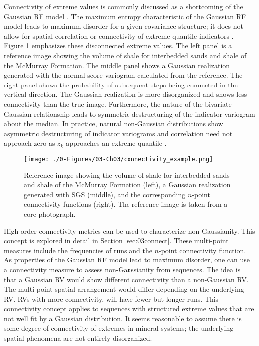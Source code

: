 Connectivity of extreme values is commonly discussed as a shortcoming of the Gaussian \gls{RF} model \citep{journel1993entropy,journel1989nongaussian,yan2020multivariate,guthke2017link,kerrou2008issues}. The maximum entropy characteristic of the Gaussian \gls{RF} model leads to maximum disorder for a given covariance structure; it does not allow for spatial correlation or connectivity of extreme quantile indicators \citep{kerrou2008issues}. Figure \ref{fig:connectivity_example} emphasizes these disconnected extreme values. The left panel is a reference image showing the volume of shale for interbedded sands and shale of the McMurray Formation. The middle panel shows a Gaussian realization generated with the normal score variogram calculated from the reference. The right panel shows the probability of subsequent steps being connected in the vertical direction. The Gaussian realization is more disorganized and shows less connectivity than the true image. Furthermore, the nature of the bivariate Gaussian relationship leads to symmetric destructuring of the indicator variogram about the median. In practice, natural non-Gaussian distributions show asymmetric destructuring of indicator variograms \citep{vincent2021multipleindicator} and correlation need not approach zero as $z_{k}$ approaches an extreme quantile \citep{journel1989nongaussian}.

\begin{figure}[htb!]
    \centering
    \texttt{[image: ./0-Figures/03-Ch03/connectivity\_example.png]}
    \caption{Reference image showing the volume of shale for interbedded sands and shale of the McMurray Formation (left), a Gaussian realization generated with \gls{SGS} (middle), and the corresponding $n$-point connectivity functions (right). The reference image is taken from a core photograph.}
    \label{fig:connectivity_example}
\end{figure}

High-order connectivity metrics can be used to characterize non-Gaussianity. This concept is explored in detail in Section \ref{sec:03connect}. These multi-point measures include the frequencies of runs and the $n$-point connectivity function. As properties of the Gaussian \gls{RF} model lead to maximum disorder, one can use a connectivity measure to assess non-Gaussianity from sequences. The idea is that a Gaussian \gls{RV} would show different connectivity than a non-Gaussian \gls{RV}. The multi-point spatial arrangement would differ depending on the underlying \gls{RV}. \Glspl{RV} with more connectivity, will have fewer but longer runs. This connectivity concept applies to sequences with structured extreme values that are not well fit by a Gaussian distribution. It seems reasonable to assume there is some degree of connectivity of extremes in mineral systems; the underlying spatial phenomena are not entirely disorganized.

